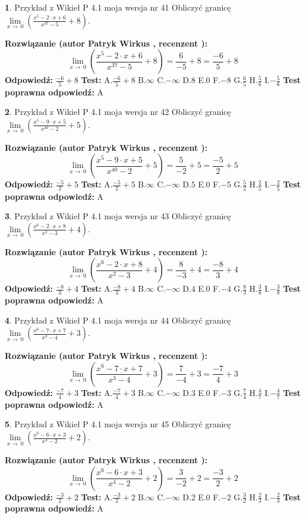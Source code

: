 \documentclass[12pt, a4paper]{article}
\theoremstyle{definition} %
\newtheorem{zad}{}
\newcommand{\zadStart}[1]{\begin{zad}#1\newline}
\newcommand{\zadStop}{\end{zad}}
\newcommand{\rozwStart}[2]{\noindent \textbf{Rozwiązanie (autor #1 , recenzent #2): }\newline}
\newcommand{\rozwStop}{\newline}
\newcommand{\odpStart}{\noindent \textbf{Odpowiedź:}\newline}
\newcommand{\odpStop}{\newline}
\newcommand{\testStart}{\noindent \textbf{Test:}\newline}
\newcommand{\testStop}{\newline}
\newcommand{\kluczStart}{\noindent \textbf{Test poprawna odpowiedź:}\newline}
\newcommand{\kluczStop}{\newline}
\begin{document}
\zadStart{Przykład z Wikieł P 4.1 moja wersja nr 41}
Obliczyć granicę $\lim\limits_{x\to\ 0}(\frac{x^{5}-2 \cdot x +6}{x^{37}-5}+8)$.
\zadStop
\rozwStart{Patryk Wirkus}{}
$$\lim\limits_{x\to\ 0}(\frac{x^{5}-2 \cdot x +6}{x^{37}-5}+8)=\frac{6}{-5}+8=\frac{-6}{5}+8$$
\rozwStop
\odpStart
$\frac{-6}{5}+8$
\odpStop
\testStart
A.$\frac{-6}{5}+8$
B.$\infty$
C.$-\infty$
D.$8$
E.$0$
F.$-8$
G.$\frac{6}{5}$
H.$\frac{5}{6}$
I.$-\frac{5}{6}$
\testStop
\kluczStart
A
\kluczStop



\zadStart{Przykład z Wikieł P 4.1 moja wersja nr 42}
Obliczyć granicę $\lim\limits_{x\to\ 0}(\frac{x^{5}-9 \cdot x +5}{x^{40}-2}+5)$.
\zadStop
\rozwStart{Patryk Wirkus}{}
$$\lim\limits_{x\to\ 0}(\frac{x^{5}-9 \cdot x +5}{x^{40}-2}+5)=\frac{5}{-2}+5=\frac{-5}{2}+5$$
\rozwStop
\odpStart
$\frac{-5}{2}+5$
\odpStop
\testStart
A.$\frac{-5}{2}+5$
B.$\infty$
C.$-\infty$
D.$5$
E.$0$
F.$-5$
G.$\frac{5}{2}$
H.$\frac{2}{5}$
I.$-\frac{2}{5}$
\testStop
\kluczStart
A
\kluczStop



\zadStart{Przykład z Wikieł P 4.1 moja wersja nr 43}
Obliczyć granicę $\lim\limits_{x\to\ 0}(\frac{x^{6}-2 \cdot x +8}{x^{2}-3}+4)$.
\zadStop
\rozwStart{Patryk Wirkus}{}
$$\lim\limits_{x\to\ 0}(\frac{x^{6}-2 \cdot x +8}{x^{2}-3}+4)=\frac{8}{-3}+4=\frac{-8}{3}+4$$
\rozwStop
\odpStart
$\frac{-8}{3}+4$
\odpStop
\testStart
A.$\frac{-8}{3}+4$
B.$\infty$
C.$-\infty$
D.$4$
E.$0$
F.$-4$
G.$\frac{8}{3}$
H.$\frac{3}{8}$
I.$-\frac{3}{8}$
\testStop
\kluczStart
A
\kluczStop



\zadStart{Przykład z Wikieł P 4.1 moja wersja nr 44}
Obliczyć granicę $\lim\limits_{x\to\ 0}(\frac{x^{6}-7 \cdot x +7}{x^{3}-4}+3)$.
\zadStop
\rozwStart{Patryk Wirkus}{}
$$\lim\limits_{x\to\ 0}(\frac{x^{6}-7 \cdot x +7}{x^{3}-4}+3)=\frac{7}{-4}+3=\frac{-7}{4}+3$$
\rozwStop
\odpStart
$\frac{-7}{4}+3$
\odpStop
\testStart
A.$\frac{-7}{4}+3$
B.$\infty$
C.$-\infty$
D.$3$
E.$0$
F.$-3$
G.$\frac{7}{4}$
H.$\frac{4}{7}$
I.$-\frac{4}{7}$
\testStop
\kluczStart
A
\kluczStop



\zadStart{Przykład z Wikieł P 4.1 moja wersja nr 45}
Obliczyć granicę $\lim\limits_{x\to\ 0}(\frac{x^{6}-6 \cdot x +3}{x^{4}-2}+2)$.
\zadStop
\rozwStart{Patryk Wirkus}{}
$$\lim\limits_{x\to\ 0}(\frac{x^{6}-6 \cdot x +3}{x^{4}-2}+2)=\frac{3}{-2}+2=\frac{-3}{2}+2$$
\rozwStop
\odpStart
$\frac{-3}{2}+2$
\odpStop
\testStart
A.$\frac{-3}{2}+2$
B.$\infty$
C.$-\infty$
D.$2$
E.$0$
F.$-2$
G.$\frac{3}{2}$
H.$\frac{2}{3}$
I.$-\frac{2}{3}$
\testStop
\kluczStart
A
\kluczStop
\end{document}
